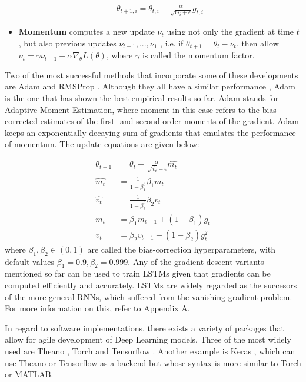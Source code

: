 \documentclass[pdftex,10pt,a4paper,journal]{article}
\theoremstyle{definition}
\theoremstyle{remark}
\begin{document}
\begin{multicols}{2}
\begin{itemize}
    \begin{align*}
        \theta_{t+1, i} = \theta_{t, i} - \frac{\alpha}{\sqrt{G_i + \epsilon}}g_{t, i}
    \end{align*}
\item \textbf{Momentum} computes a new update $\nu_t$ using not only the gradient at time $t$, but also previous updates $\nu_{t-1}, ..., \nu_1$ \cite{Ruder2015}, i.e. if $\theta_{t+1} = \theta_t - \nu_t$, then allow $\nu_t = \gamma\nu_{t-1} + \alpha\nabla_\theta L(\theta)$, where $\gamma$ is called the momentum factor.
\end{itemize}
 \par Two of the most successful methods that incorporate some of these developments are Adam and RMSProp \cite{Kingma2014}. Although they all have a similar performance \cite{Kingma2014}, Adam is the one that has shown the best empirical results so far. Adam stands for Adaptive Moment Estimation, where moment in this case refers to the bias-corrected estimates of the first- and second-order moments of the gradient. Adam keeps an exponentially decaying sum of gradients that emulates the performance of momentum. The update equations are given below:

\begin{align*}
    \theta_{t+1} &= \theta_t - \frac{\alpha}{\sqrt{\hat{v_t}} + \epsilon}\hat{m_t}\\
    \hat{m_t} &= \frac{1}{1 - \beta_1^t}\beta_1 m_t\\
    \hat{v_t} &= \frac{1}{1 - \beta_2^t}\beta_2 v_t\\
    m_t &= \beta_1m_{t-1} + (1 - \beta_1)g_t\\
    v_t &= \beta_2v_{t-1} + (1 - \beta_2)g_t^2
\end{align*}
where $\beta_1, \beta_2 \in (0, 1)$ are called the bias-correction hyperparameters, with default values $\beta_1 = 0.9, \beta_2 = 0.999$. Any of the gradient descent variants mentioned so far can be used to train LSTMs given that gradients can be computed efficiently and accurately. LSTMs are widely regarded as the succesors of the more general RNNs, which suffered from the vanishing gradient problem. For more information on this, refer to Appendix A.

\par In regard to software implementations, there exists a variety of packages that allow for agile development of Deep Learning models. Three of the most widely used are Theano \cite{Bergstra2010,Bastien2012}, Torch \cite{Collobert2011} and Tensorflow \cite{tensorflow}. Another example is Keras \cite{chollet2015keras}, which can use Theano or Tensorflow as a backend but whose syntax is more similar to Torch or MATLAB.


\end{multicols}
\end{document}
